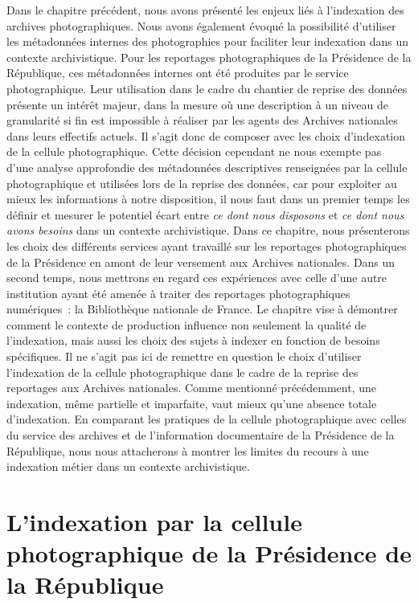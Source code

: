 Dans le chapitre précédent, nous avons présenté les enjeux liés à l’indexation des archives photographiques. Nous avons également évoqué la possibilité d'utiliser les métadonnées internes des photographies pour faciliter leur indexation dans un contexte archivistique. Pour les reportages photographiques de la Présidence de la République, ces métadonnées internes ont été produites par le service photographique. Leur utilisation dans le cadre du chantier de reprise des données présente un intérêt majeur, dans la mesure où une description à un niveau de granularité si fin est impossible à réaliser par les agents des Archives nationales dans leurs effectifs actuels. Il s’agit donc de composer avec les choix d’indexation de la cellule photographique. Cette décision cependant ne nous exempte pas d’une analyse approfondie des métadonnées descriptives renseignées par la cellule photographique et utilisées lors de la reprise des données, car pour exploiter au mieux les informations à notre disposition, il nous faut dans un premier temps les définir et mesurer le potentiel écart entre \emph{ce dont nous disposons} et \emph{ce dont nous avons besoins} dans un contexte archivistique.  Dans ce chapitre, nous présenterons les choix des différents services ayant travaillé sur les reportages photographiques de la Présidence en amont de leur versement aux Archives nationales. Dans un second temps, nous mettrons en regard ces expériences avec celle d’une autre institution ayant été amenée à traiter des reportages photographiques numériques : la Bibliothèque nationale de France. Le chapitre vise à démontrer comment le contexte de production influence non seulement la qualité de l'indexation, mais aussi les choix des sujets à indexer en fonction de besoins spécifiques. Il ne s’agit pas ici de remettre en question le choix d’utiliser l’indexation de la cellule photographique dans le cadre de la reprise des reportages aux Archives nationales. Comme mentionné précédemment, une indexation, même partielle et imparfaite, vaut mieux qu'une absence totale d’indexation. En comparant les pratiques de la cellule photographique avec celles du service des archives et de l'information documentaire de la Présidence de la République, nous nous attacherons à montrer les limites du recours à une indexation métier dans un contexte archivistique.

\section{L’indexation par la cellule photographique de la Présidence de la République}

